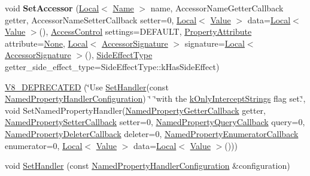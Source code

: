 \begin{DoxyCompactItemize}
void {\bfseries Set\+Accessor} (\mbox{\hyperlink{classv8_1_1Local}{Local}}$<$ \mbox{\hyperlink{classv8_1_1Name}{Name}} $>$ name, Accessor\+Name\+Getter\+Callback getter, Accessor\+Name\+Setter\+Callback setter=0, \mbox{\hyperlink{classv8_1_1Local}{Local}}$<$ \mbox{\hyperlink{classv8_1_1Value}{Value}} $>$ data=\mbox{\hyperlink{classv8_1_1Local}{Local}}$<$ \mbox{\hyperlink{classv8_1_1Value}{Value}} $>$(), \mbox{\hyperlink{namespacev8_a31d8355cb043d7d2dda3f4a52760b64e}{Access\+Control}} settings=D\+E\+F\+A\+U\+LT, \mbox{\hyperlink{namespacev8_a05f25f935e108a1ea2d150e274602b87}{Property\+Attribute}} attribute=\mbox{\hyperlink{namespacev8_a05f25f935e108a1ea2d150e274602b87a7ab4d58719c33b3ea2dfaefa29b111df}{None}}, \mbox{\hyperlink{classv8_1_1Local}{Local}}$<$ \mbox{\hyperlink{classv8_1_1AccessorSignature}{Accessor\+Signature}} $>$ signature=\mbox{\hyperlink{classv8_1_1Local}{Local}}$<$ \mbox{\hyperlink{classv8_1_1AccessorSignature}{Accessor\+Signature}} $>$(), \mbox{\hyperlink{namespacev8_a29711319c2b9fc7716d65faee2f7b9cb}{Side\+Effect\+Type}} getter\+\_\+side\+\_\+effect\+\_\+type=Side\+Effect\+Type\+::k\+Has\+Side\+Effect)
\item 
\mbox{\hyperlink{classv8_1_1ObjectTemplate_acf39e693ef3304f5f2a8a0e6afd106e9}{V8\+\_\+\+D\+E\+P\+R\+E\+C\+A\+T\+ED}} (\char`\"{}Use \mbox{\hyperlink{classv8_1_1ObjectTemplate_a3d5666f1e9b0f46df6b4dbb7cfbb6114}{Set\+Handler}}(const \mbox{\hyperlink{structv8_1_1NamedPropertyHandlerConfiguration}{Named\+Property\+Handler\+Configuration}}) \char`\"{} \char`\"{}with the \mbox{\hyperlink{namespacev8_af4789f0aeb8680e353901a35810cac1aa5258a8ba1695c486fea7d5b126c95509}{k\+Only\+Intercept\+Strings}} flag set.\char`\"{}, void Set\+Named\+Property\+Handler(\mbox{\hyperlink{namespacev8_a50cae386a68bf9ff23d02aa1161face4}{Named\+Property\+Getter\+Callback}} getter, \mbox{\hyperlink{namespacev8_a9587769513971dc7cb301b740d9e66b6}{Named\+Property\+Setter\+Callback}} setter=0, \mbox{\hyperlink{namespacev8_ac135beae5f0c8b290255accb438f990e}{Named\+Property\+Query\+Callback}} query=0, \mbox{\hyperlink{namespacev8_aaba861076c5b111912cfa0791d348437}{Named\+Property\+Deleter\+Callback}} deleter=0, \mbox{\hyperlink{namespacev8_a5f6f16818a9cddacadbfe6d90ca3a6b1}{Named\+Property\+Enumerator\+Callback}} enumerator=0, \mbox{\hyperlink{classv8_1_1Local}{Local}}$<$ \mbox{\hyperlink{classv8_1_1Value}{Value}} $>$ data=\mbox{\hyperlink{classv8_1_1Local}{Local}}$<$ \mbox{\hyperlink{classv8_1_1Value}{Value}} $>$()))
\item 
void \mbox{\hyperlink{classv8_1_1ObjectTemplate_a3d5666f1e9b0f46df6b4dbb7cfbb6114}{Set\+Handler}} (const \mbox{\hyperlink{structv8_1_1NamedPropertyHandlerConfiguration}{Named\+Property\+Handler\+Configuration}} \&configuration)

\end{DoxyCompactItemize}
